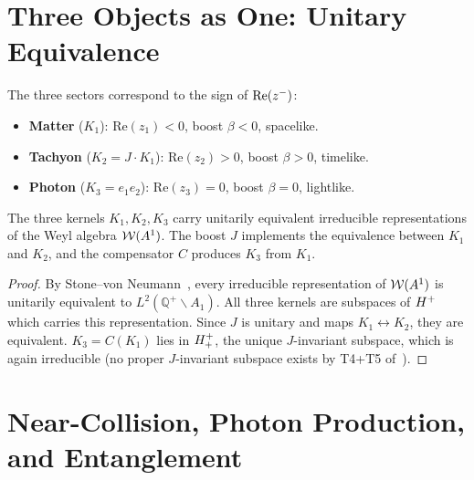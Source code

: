 \section{Three Objects as One: Unitary Equivalence}
\label{sec:unitary}

\begin{definition}
The three sectors correspond to the sign of $\mathrm{Re}(z^-)$:
\begin{itemize}
  \item \textbf{Matter} ($K_1$): $\mathrm{Re}(z_1)<0$, boost $\beta<0$, spacelike.
  \item \textbf{Tachyon} ($K_2=J\cdot K_1$): $\mathrm{Re}(z_2)>0$, boost $\beta>0$, timelike.
  \item \textbf{Photon} ($K_3=e_1 e_2$): $\mathrm{Re}(z_3)=0$, boost $\beta=0$, lightlike.
\end{itemize}
\end{definition}

\begin{theorem}\label{thm:unitary-equiv}
The three kernels $K_1,K_2,K_3$ carry unitarily equivalent
irreducible representations of the Weyl algebra $\mathcal{W}(A^1)$.
The boost $J$ implements the equivalence between $K_1$ and $K_2$,
and the compensator $C$ produces $K_3$ from $K_1$.
\end{theorem}

\begin{proof}
By Stone--von Neumann~\cite{brendecke2026rh}, every irreducible
representation of $\mathcal{W}(A^1)$ is unitarily equivalent to $L^2(\mathbb{Q}^+\backslash A_1)$.
All three kernels are subspaces of $H^+$ which carries this
representation.
Since $J$ is unitary and maps $K_1\leftrightarrow K_2$, they are
equivalent.
$K_3=C(K_1)$ lies in $H^+_+$, the unique $J$-invariant subspace,
which is again irreducible (no proper $J$-invariant subspace exists by
T4+T5 of~\cite{brendecke2026rh}).
\end{proof}


\section{Near-Collision, Photon Production, and Entanglement}
\label{sec:entanglement}

